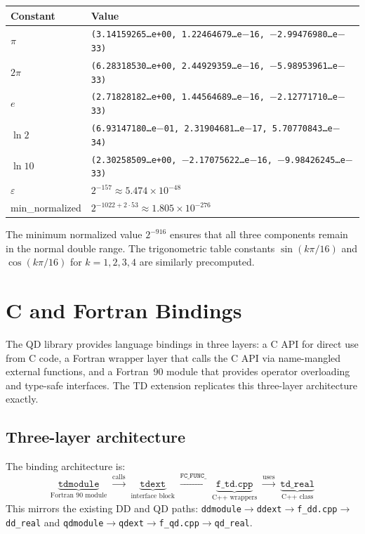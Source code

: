 \documentclass[11pt,a4paper]{article}
\begin{document}
\begin{center}
\begin{tabular}{ll}
\toprule
Constant & Value \\
\midrule
$\pi$          & \texttt{(3.14159265\ldots e+00, 1.22464679\ldots e$-$16, $-$2.99476980\ldots e$-$33)} \\
$2\pi$         & \texttt{(6.28318530\ldots e+00, 2.44929359\ldots e$-$16, $-$5.98953961\ldots e$-$33)} \\
$e$            & \texttt{(2.71828182\ldots e+00, 1.44564689\ldots e$-$16, $-$2.12771710\ldots e$-$33)} \\
$\ln 2$        & \texttt{(6.93147180\ldots e$-$01, 2.31904681\ldots e$-$17, 5.70770843\ldots e$-$34)} \\
$\ln 10$       & \texttt{(2.30258509\ldots e+00, $-$2.17075622\ldots e$-$16, $-$9.98426245\ldots e$-$33)} \\
$\varepsilon$  & $2^{-157} \approx 5.474 \times 10^{-48}$ \\
min\_normalized & $2^{-1022+2\cdot 53} \approx 1.805 \times 10^{-276}$ \\
\bottomrule
\end{tabular}
\end{center}

The minimum normalized value $2^{-916}$ ensures that all three
components remain in the normal double range.  The trigonometric
table constants $\sin(k\pi/16)$ and $\cos(k\pi/16)$ for
$k = 1, 2, 3, 4$ are similarly precomputed.


\section{C and Fortran Bindings}
\label{sec:bindings}

The QD library provides language bindings in three layers: a C API
for direct use from C code, a Fortran wrapper layer that calls the
C API via name-mangled external functions, and a Fortran~90 module
that provides operator overloading and type-safe interfaces.  The
TD extension replicates this three-layer architecture exactly.

\subsection{Three-layer architecture}

The binding architecture is:
\[
  \underbrace{\texttt{tdmodule}}_{\text{Fortran 90 module}}
  \;\xrightarrow{\text{calls}}\;
  \underbrace{\texttt{tdext}}_{\text{interface block}}
  \;\xrightarrow{\texttt{FC\_FUNC\_}}\;
  \underbrace{\texttt{f\_td.cpp}}_{\text{C++ wrappers}}
  \;\xrightarrow{\text{uses}}\;
  \underbrace{\texttt{td\_real}}_{\text{C++ class}}
\]
This mirrors the existing DD and QD paths:
\texttt{ddmodule}$\to$\texttt{ddext}$\to$\texttt{f\_dd.cpp}$\to$\texttt{dd\_real}
and
\texttt{qdmodule}$\to$\texttt{qdext}$\to$\texttt{f\_qd.cpp}$\to$\texttt{qd\_real}.
\end{document}
